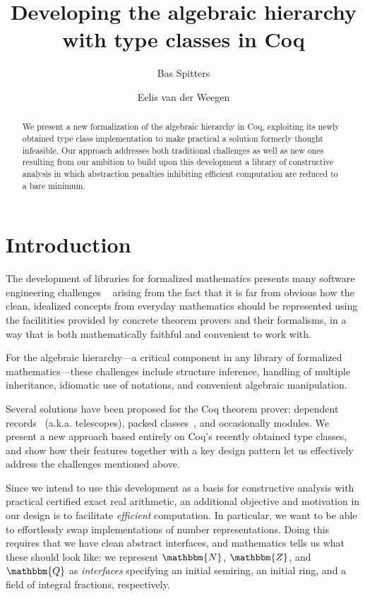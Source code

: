 \documentclass{llncs}
\newcommand{\N}{\ensuremath{\mathbbm{N}}}
\newcommand{\Z}{\ensuremath{\mathbbm{Z}}}
\newcommand{\Q}{\ensuremath{\mathbbm{Q}}}
\begin{document}
\title{Developing the algebraic hierarchy with type classes in Coq}
\author{Bas Spitters \and Eelis van der Weegen}
\maketitle
\begin{abstract}
We present a new formalization of the algebraic hierarchy in Coq, exploiting its newly obtained type class implementation to make practical a solution formerly thought infeasible. Our approach addresses both traditional challenges as well as new ones resulting from our ambition to build upon this development a library of constructive analysis in which abstraction penalties inhibiting efficient computation are reduced to a bare minimum.
\end{abstract}

\section{Introduction}
The development of libraries for formalized mathematics presents many software engineering challenges ~\cite{C-corn,DBLP:conf/types/HaftmannW08} arising from the fact that it is far from obvious how the clean, idealized concepts from everyday mathematics should be represented using the facilitities provided by concrete theorem provers and their formalisms, in a way that is both mathematically faithful and convenient to work with.

For the algebraic hierarchy---a critical component in any library of formalized mathematics---these challenges include structure inference, handling of multiple inheritance, idiomatic use of notations, and convenient algebraic manipulation.

Several solutions have been proposed for the Coq theorem prover: dependent records~\cite{DBLP:journals/jsc/GeuversPWZ02} (a.k.a. telescopes), packed classes~\cite{Packed}, and occasionally modules. We present a new approach based entirely on Coq's recently obtained type classes, and show how their features together with a key design pattern let us effectively address the challenges mentioned above.

Since we intend to use this development as a basis for constructive analysis with practical certified exact real arithmetic, an additional objective and motivation in our design is to facilitate \emph{efficient} computation. In particular, we want to be able to effortlessly swap implementations of number representations. Doing this requires that we have clean abstract interfaces, and mathematics tells us what these should look like: we represent $\N$, $\Z$, and $\Q$ as \emph{interfaces} specifying an initial semiring, an initial ring, and a field of integral fractions, respectively.
\end{document}
